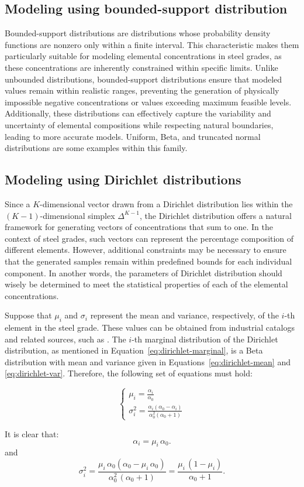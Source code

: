 \documentclass[12pt,a4paper]{article}
\begin{document}
	\subsection{Modeling using bounded-support distribution}
	Bounded-support distributions are distributions whose probability density functions  are nonzero only within a finite interval. This characteristic makes them particularly suitable for modeling elemental concentrations in steel grades, as these concentrations are inherently constrained within specific limits. Unlike unbounded distributions, bounded-support distributions ensure that modeled values remain within realistic ranges, preventing the generation of physically impossible negative concentrations or values exceeding maximum feasible levels. Additionally, these distributions can effectively capture the variability and uncertainty of elemental compositions while respecting natural boundaries, leading to more accurate models. Uniform, Beta, and truncated normal distributions are some examples within this family.
	
	\subsection{Modeling using Dirichlet distributions}
	Since a $K$-dimensional vector drawn from a Dirichlet distribution lies within the $(K\!-\!1)$-dimensional simplex $\Delta^{K-1}$, the Dirichlet distribution offers a natural framework for generating vectors of concentrations that sum to one. In the context of steel grades, such vectors can represent the percentage composition of different elements. However, additional constraints may be necessary to ensure that the generated samples remain within predefined bounds for each individual component. In another words, the parameters of Dirichlet distribution should wisely be determined to meet the statistical properties of each of the elemental concentrations. 
	
	Suppose that $\mu_i$ and $\sigma_i$ represent the mean and variance, respectively, of the $i$-th element in the steel grade. These values can be obtained from industrial catalogs and related sources, such as \cite{matweb2025}. The $i$-th marginal distribution of the Dirichlet distribution, as mentioned in Equation~\ref{eq:dirichlet-marginal}, is a Beta distribution with mean and variance given in Equations~\ref{eq:dirichlet-mean} and \ref{eq:dirichlet-var}. Therefore, the following set of equations must hold:


	\begin{flushleft}
		\begin{equation}
			\left\{
			\begin{array}{l}
				\mu_i = \frac{\alpha_i}{\alpha_0} \\[6pt]
				\sigma_i^2 = \frac{\alpha_i(\alpha_0 - \alpha_i)}{\alpha_0^2 (\alpha_0 + 1)}
			\end{array}
			\right.
			\label{eq:mu_sigma}
		\end{equation}
	\end{flushleft}
	It is clear that:
	\[
	\alpha_i = \mu_i \, \alpha_0.
	\]
	and
	\[
	\sigma_i^2 = \frac{\mu_i \, \alpha_0 \left( \alpha_0 - \mu_i \, \alpha_0 \right)}{\alpha_0^2 \, (\alpha_0 + 1)}
	= \frac{\mu_i \, (1 - \mu_i)}{\alpha_0 + 1}.
	\]
\end{document}

